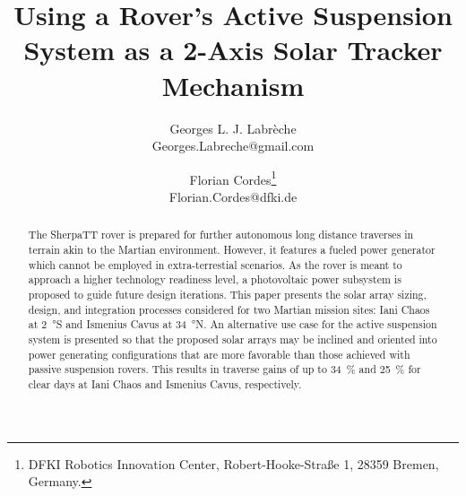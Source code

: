 \documentclass[twocolumn,letterpaper]{IEEEAerospaceCLS}  %
\begin{document}
\title{Using a Rover's Active Suspension System as a 2-Axis Solar Tracker Mechanism}

\author{%
Georges L. J. Labrèche\\
Georges.Labreche@gmail.com
\and
Florian Cordes\footnote{DFKI Robotics Innovation Center, Robert-Hooke-Straße 1, 28359 Bremen, Germany.}\\
Florian.Cordes@dfki.de
}


\maketitle

\thispagestyle{plain}
\pagestyle{plain}


\begin{abstract}
The SherpaTT rover is prepared for further autonomous long distance traverses in terrain akin to the Martian environment. However, it features a fueled power generator which cannot be employed in extra-terrestial scenarios. As the rover is meant to approach a higher technology readiness level, a photovoltaic power subsystem is proposed to guide future design iterations. This paper presents the solar array sizing, design, and integration processes considered for two Martian mission sites: Iani Chaos at \SI{2}{\degree}S and Ismenius Cavus at \SI{34}{\degree}N. An alternative use case for the active suspension system is presented so that the proposed solar arrays may be inclined and oriented into power generating configurations that are more favorable than those achieved with passive suspension rovers. This results in traverse gains of up to \SI{34}{\percent} and \SI{25}{\percent} for clear days at Iani Chaos and Ismenius Cavus, respectively.
\end{abstract}
\end{document}
